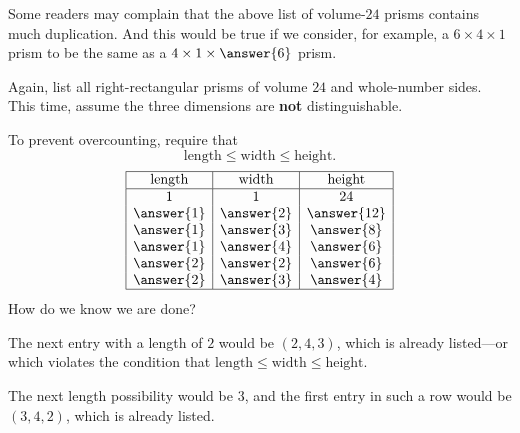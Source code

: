 \documentclass[nooutcomes]{ximera}
\begin{document}
\newpage
\begin{problem}
Some readers may complain that the above list of volume-$24$ prisms contains much duplication.  And this would be true if we consider, for example, a $6\times4\times1$ prism to be the same as a $4\times1\times\answer{6}$ prism.  

Again, list all right-rectangular prisms of volume $24$ and whole-number sides.  This time, assume the three dimensions are \textbf{not} distinguishable. 

\begin{solution}
To prevent overcounting, require that 
\[
\text{length} \le \text{width} \le \text{height}. 
\]
\[
\begin{array}{|c|c|c|}
\hline
\text{length} & \text{width} & \text{height} \\ 
\hline
1 & 1 & 24 \\
\answer{1} & \answer{2} & \answer{12} \\
\answer{1} & \answer{3} & \answer{8} \\
\answer{1} & \answer{4} & \answer{6} \\
\answer{2} & \answer{2} & \answer{6} \\
\answer{2} & \answer{3} & \answer{4} \\
\hline
\end{array}
\]
How do we know we are done?  
\begin{freeResponse}
\begin{hint}
The next entry with a length of $2$ would be $(2,4,3)$, which is already listed---or which violates the condition that 
$\text{length} \le \text{width} \le \text{height}$.

The next length possibility would be $3$, and the first entry in such a row would be $(3,4,2)$, which is already listed. 
\end{hint}
\end{freeResponse}
\end{solution}
\end{problem}
\end{document}
